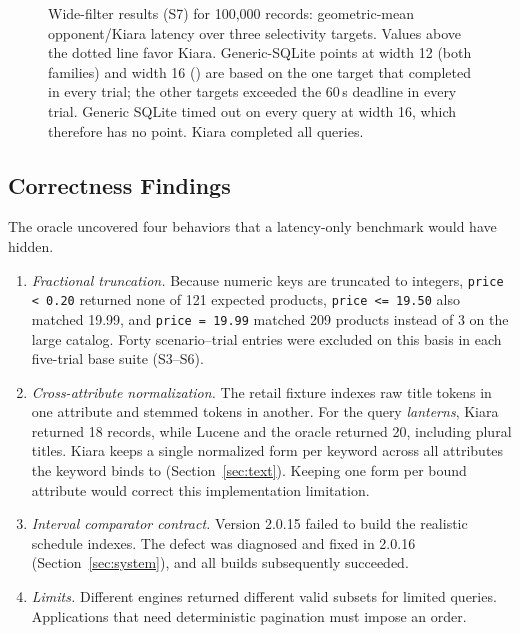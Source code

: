 \begin{figure}[t]
\caption{Wide-filter results (S7) for 100,000 records: geometric-mean opponent/Kiara latency over three selectivity targets. Values above the dotted line favor Kiara. Generic-SQLite points at width 12 (both families) and width 16 () are based on the one target that completed in every trial; the other targets exceeded the 60\,s deadline in every trial. Generic SQLite timed out on every  query at width 16, which therefore has no point. Kiara completed all queries.}
\label{fig:wide}
\end{figure}

\subsection{Correctness Findings}
\label{sec:correctness}
The oracle uncovered four behaviors that a latency-only benchmark would have hidden.
\begin{enumerate}
\item \emph{Fractional truncation.} Because numeric keys are truncated to integers, \texttt{price < 0.20} returned none of 121 expected products, \texttt{price <= 19.50} also matched 19.99, and \texttt{price = 19.99} matched 209 products instead of 3 on the large catalog. Forty scenario--trial entries were excluded on this basis in each five-trial base suite (S3--S6).
\item \emph{Cross-attribute normalization.} The retail fixture indexes raw title tokens in one attribute and stemmed tokens in another. For the query \emph{lanterns}, Kiara returned 18 records, while Lucene and the oracle returned 20, including plural titles. Kiara keeps a single normalized form per keyword across all attributes the keyword binds to (Section~\ref{sec:text}). Keeping one form per bound attribute would correct this implementation limitation.
\item \emph{Interval comparator contract.} Version 2.0.15 failed to build the realistic schedule indexes. The defect was diagnosed and fixed in 2.0.16 (Section~\ref{sec:system}), and all builds subsequently succeeded.
\item \emph{Limits.} Different engines returned different valid subsets for limited queries. Applications that need deterministic pagination must impose an order.
\end{enumerate}
